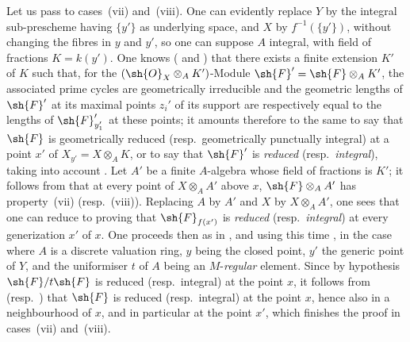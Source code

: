 \begin{env}[12.1.1.3]
\label{IV.12.1.1.3}
Let us pass to cases~(vii) and~(viii).
One can evidently replace $Y$ by the integral sub-prescheme having $\{y'\}$ as underlying space, and $X$ by $f^{-1}(\{y'\})$, without changing the fibres in $y$ and $y'$, so one can suppose $A$ integral, with field of fractions $K=k(y')$.
One knows ( and ) that there exists a finite extension $K'$ of $K$ such that, for the $(\sh{O}_X\otimes_A K')$-Module $\sh{F}'=\sh{F}\otimes_A K'$, the associated prime cycles are geometrically irreducible and the geometric lengths of $\sh{F}'$ at its maximal points $z_i'$ of its support are respectively equal to the lengths of $\sh{F}_{y_1'}'$ at these points; it amounts therefore to the same to say that $\sh{F}$ is geometrically reduced (resp.\ geometrically punctually integral) at a point $x'$ of $X_{y'}=X\otimes_A K$, or to say that $\sh{F}'$ is \emph{reduced} (resp.\ \emph{integral}), taking into account .
Let $A'$ be a finite $A$-algebra whose field of fractions is $K'$; it follows from  that at every point of $X\otimes_A A'$ above $x$, $\sh{F}\otimes_A A'$ has property~(vii) (resp.~(viii)).
Replacing $A$ by $A'$ and $X$ by $X\otimes_A A'$, one sees that one can reduce to proving that $\sh{F}_{f(x')}$ is \emph{reduced} (resp.\ \emph{integral}) at every generization $x'$ of $x$.
One proceeds then as in , and using this time , in the case where $A$ is a discrete valuation ring, $y$ being the closed point, $y'$ the generic point of $Y$, and the uniformiser $t$ of $A$ being an $M$-\emph{regular} element.
Since by hypothesis $\sh{F}/t\sh{F}$ is reduced (resp.\ integral) at the point $x$, it follows from  (resp.\ ) that $\sh{F}$ is reduced (resp.\ integral) at the point $x$, hence also in a neighbourhood of $x$, and in particular at the point $x'$, which finishes the proof in cases~(vii) and~(viii).
\end{env}

